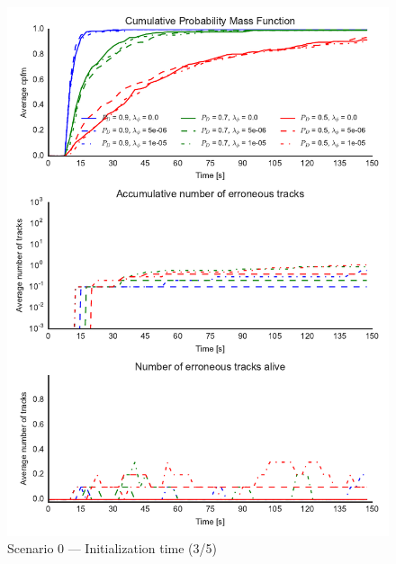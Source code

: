 \begin{figure}
\centering
\includegraphics{Figures/plots/Scenario0_Init-Time(3-5).pdf}
\caption{Scenario 0 --- Initialization time (3/5)}\label{fig:init0_time_3-5}
\end{figure}


